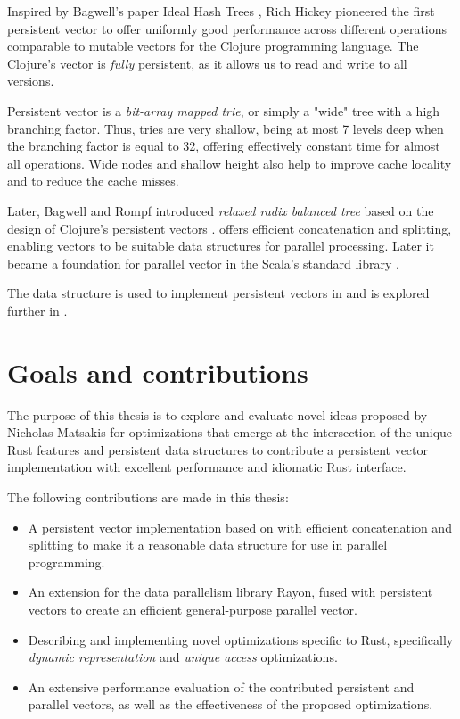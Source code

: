 Inspired by Bagwell's paper Ideal Hash Trees \cite{ideal-hash-trees}, Rich Hickey pioneered the first persistent vector to offer uniformly good performance across different operations comparable to mutable vectors for the Clojure programming language. The Clojure's vector is \emph{fully} persistent, as it allows us to read and write to all versions.

Persistent vector is a \emph{bit-array mapped trie}, or simply a "wide" tree with a high branching factor. Thus, tries are very shallow, being at most 7 levels deep when the branching factor is equal to 32, offering effectively constant time for almost all operations. Wide nodes and shallow height also help to improve cache locality and to reduce the cache misses.

Later, Bagwell and Rompf introduced \emph{relaxed radix balanced tree} based on the design of Clojure's persistent vectors \cite{efficient-immutable-vectors}. \treerrb{} offers efficient concatenation and splitting, enabling vectors to be suitable data structures for parallel processing. Later it became a foundation for parallel vector in the Scala's standard library \cite{rrb-vector-practical-general-purpose-im-sequence}.

The \treerrb{} data structure is used to implement persistent vectors in \pvecrs{} and is explored further in .

\section{Goals and contributions}
\label{sec:contributions}
The purpose of this thesis is to explore and evaluate novel ideas proposed by Nicholas Matsakis for optimizations that emerge at the intersection of the unique Rust features and persistent data structures to contribute a persistent vector implementation with excellent performance and idiomatic Rust interface.

The following contributions are made in this thesis:
\begin{itemize}
    \item A persistent vector implementation based on \treerrb{} with efficient concatenation and splitting to make it a reasonable data structure for use in parallel programming.
    \item An extension for the data parallelism library Rayon, fused with persistent vectors to create an efficient general-purpose parallel vector.
    \item Describing and implementing novel optimizations specific to Rust, specifically \emph{dynamic representation} and \emph{unique access} optimizations.
    \item An extensive performance evaluation of the contributed persistent and parallel vectors, as well as the effectiveness of the proposed optimizations.
\end{itemize}

